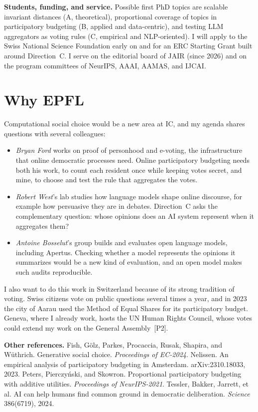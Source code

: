 \documentclass[11pt,a4paper]{article}
\newcommand{\pub}[1]{~[#1]}
\begin{document}
\textbf{Students, funding, and service.} Possible first PhD topics are scalable invariant distances (A, theoretical), proportional
coverage of topics in participatory budgeting (B, applied and data-centric),
and testing LLM aggregators as voting rules (C, empirical and NLP-oriented). I will apply to the Swiss National Science Foundation early on and for an ERC
Starting Grant built around Direction~C. I serve on the editorial board of
JAIR (since 2026) and on the program committees of NeurIPS, AAAI, AAMAS,
and IJCAI.

\section{Why EPFL}

Computational social choice would be a new area at IC, and my agenda shares
questions with several colleagues:
\begin{itemize}
  \item \emph{Bryan Ford} works on proof of personhood and e-voting, the
  infrastructure that online democratic processes need. Online participatory
  budgeting needs both his work, to count each resident once while keeping
  votes secret, and mine, to choose and test the rule that aggregates the
  votes.
  \item \emph{Robert West}'s lab studies how language models shape online
  discourse, for example how persuasive they are in debates. Direction~C asks
  the complementary question: whose opinions does an AI system represent when
  it aggregates them?
  \item \emph{Antoine Bosselut}'s group builds and evaluates open language
  models, including Apertus. Checking whether a model represents the opinions
  it summarizes would be a new kind of evaluation, and an open model makes
  such audits reproducible.
\end{itemize}
I also want to do this work in Switzerland because of its strong tradition of
voting. Swiss citizens vote on public questions several times a year, and in 2023 the city of Aarau used the
Method of Equal Shares for its participatory budget. Geneva, where I already
work, hosts the UN Human Rights Council, whose votes could extend my work on
the General Assembly\pub{P2}.

{\footnotesize\textbf{Other references.}
Fish, G\"olz, Parkes, Procaccia, Rusak, Shapira, and W\"uthrich. Generative
social choice. \emph{Proceedings of EC-2024}.
Nelissen. An empirical analysis of participatory budgeting in Amsterdam.
arXiv:2310.18033, 2023.
Peters, Pierczyński, and Skowron. Proportional participatory budgeting with
additive utilities. \emph{Proceedings of NeurIPS-2021}.
Tessler, Bakker, Jarrett, et al. AI can help humans find common ground in
democratic deliberation. \emph{Science} 386(6719), 2024.\par}
\end{document}
